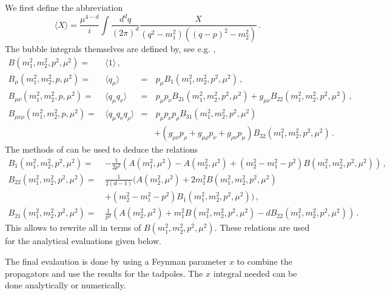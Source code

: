 \documentclass[12pt,a4paper]{article}
\begin{document}
We first define the abbreviation
\begin{equation}
\label{defB}
\langle X \rangle = \frac{\mu^{4-d}}{i}\int \frac{d^d q}{(2\pi)^d}
 \frac{X}{\left(q^2-m_1^2\right) \left((q-p)^2-m_2^2\right) }\,.
\end{equation}
The bubble integrals themselves are defined by, see e.g. \cite{Bijnens:2002hp},
\begin{align}
B(m_1^2,m_2^2,p^2,\mu^2) =\, &
\langle 1 \rangle\,, &&
\nonumber\\
B_\mu(m_1^2,m_2^2,p,\mu^2) =\, &
\langle q_\mu \rangle
& = &\,p_\mu B_1(m_1^2,m_2^2,p^2,\mu^2)\,,
\nonumber\\
B_{\mu\nu}(m_1^2,m_2^2,p,\mu^2) =\, &
\langle q_\mu q_\nu\rangle
&=&\, p_\mu p_\nu B_{21}(m_1^2,m_2^2,p^2,\mu^2)
+g_{\mu\nu} B_{22}(m_1^2,m_2^2,p^2,\mu^2)\,,
\nonumber\\
B_{\mu\nu\rho}(m_1^2,m_2^2,p,\mu^2) =\, &
\langle q_\mu q_\nu q_\rho\rangle
&=&\, p_\mu p_\nu p_\rho B_{31}(m_1^2,m_2^2,p^2,\mu^2)
\nonumber\\
& & &+\left(g_{\mu\nu}p_\rho+g_{\mu\rho}p_\nu+g_{\rho\nu}p_\mu\right) B_{32}(m_1^2,m_2^2,p^2,\mu^2)\,.
\end{align}
The methods of \cite{Passarino:1978jh}
can be used to deduce the relations
\begin{align}
B_1(m_1^2,m_2^2,p^2,\mu^2) =\, &-\frac{1}{2p^2}\left(
  A(m_1^2,\mu^2)-A(m_2^2,\mu^2)+(m_2^2-m_1^2-p^2) B(m_1^2,m_2^2,p^2,\mu^2)
\right)\,,
\nonumber\\
B_{22}(m_1^2,m_2^2,p^2,\mu^2) =\, & \frac{1}{2(d-1)}\Big(
 A(m_2^2,\mu^2)+2 m_1^2 B(m_1^2,m_2^2,p^2,\mu^2)
\nonumber\\&
+(m_2^2-m_1^2-p^2) B_1(m_1^2,m_2^2,p^2,\mu^2)
\Big)\,,
\nonumber\\
B_{21}(m_1^2,m_2^2,p^2,\mu^2) =\, &\frac{1}{p^2}\left(
  A(m_2^2,\mu^2)+m_1^2 B(m_1^2,m_2^2,p^2,\mu^2)-d B_{22}(m_1^2,m_2^2,p^2,\mu^2)
\right)\,.
\end{align}
This allows to rewrite all in terms of $B(m_1^2,m_2^2,p^2,\mu^2)$.
These relations are used for the analytical evaluations given below.

The final evalaution is done by using a Feynman parameter $x$ to
combine the propagators and use the results for the tadpoles.
The $x$ integral needed can be done analytically or numerically.
\end{document}

